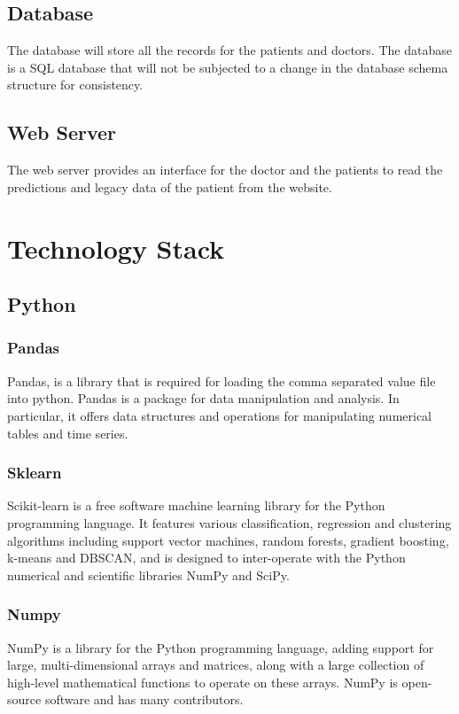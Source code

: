 \documentclass[12pt]{article}
\begin{document}
\subsection{Database}
The database will store all the records for the patients and doctors. The database is a SQL database that will not be subjected to a change in the database schema structure for consistency.

\subsection{Web Server}
The web server provides an interface for the doctor and the patients to read the predictions and legacy data of the patient from the website.

\newpage
\section{Technology Stack}
\subsection{Python}
\subsubsection{Pandas}
Pandas, is a library that is required for loading the comma separated value file into python. Pandas is a package for data manipulation and analysis. In particular, it offers data structures and operations for manipulating numerical tables and time series.

\subsubsection{Sklearn}
Scikit-learn is a free software machine learning library for the Python programming language. It features various classification, regression and clustering algorithms including support vector machines, random forests, gradient boosting, k-means and DBSCAN, and is designed to inter-operate with the Python numerical and scientific libraries NumPy and SciPy.

\subsubsection{Numpy}
NumPy is a library for the Python programming language, adding support for large, multi-dimensional arrays and matrices, along with a large collection of high-level mathematical functions to operate on these arrays. NumPy is open-source software and has many contributors.
\end{document}
